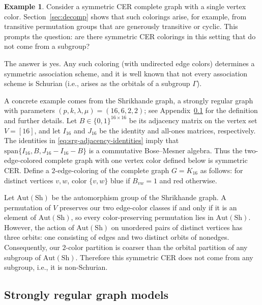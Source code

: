 \documentclass[12pt]{amsart}
\theoremstyle{plain}
\theoremstyle{definition}
\newtheorem{example}[theorem]{Example}
\theoremstyle{remark}
\newcommand{\1}{\mathbf{1}}
\begin{document}
\begin{example}\label{ex:shrikhande-non-schurian}
Consider a symmetric CER complete graph with a single vertex color.
Section~\ref{sec:decomp} shows that such colorings arise, for example, from
transitive permutation groups that are generously transitive or cyclic. This
prompts the question: are there symmetric CER colorings in this setting that
do not come from a subgroup?

The answer is yes. Any such coloring (with undirected edge colors) determines a symmetric association scheme, and it is well known that not every association scheme is Schurian (i.e., arises as the orbitals of a subgroup $\Gamma$). 

A concrete example comes from the Shrikhande graph,
a strongly regular graph with parameters
$(p,k,\lambda,\mu)=(16,6,2,2)$;
see Appendix~\ref{subsec:strongly-regular-graph-models}
for the definition and further details.
Let $B\in\{0,1\}^{16\times16}$ be its adjacency matrix
on the vertex set $V=[16]$, and let $I_{16}$ and $J_{16}$
be the identity and all-ones matrices, respectively.
The identities in \eqref{eq:srg-adjacency-identities}
imply that $\mathrm{span}\{I_{16},B,J_{16}-I_{16}-B\}$
is a commutative Bose--Mesner algebra.
Thus the two-edge-colored complete graph with one vertex color
defined below is symmetric CER.
Define a $2$-edge-coloring of the complete graph $G=K_{16}$ as follows: for distinct vertices $v,w$, color $\{v,w\}$ blue if $B_{vw}=1$ and red otherwise.

Let \(\mathrm{Aut}(\mathrm{Sh})\) be the automorphism group of the Shrikhande graph. A permutation of \(V\) preserves our two edge-color classes if and only if it is an element of \(\mathrm{Aut}(\mathrm{Sh})\), so every color-preserving permutation lies in \(\mathrm{Aut}(\mathrm{Sh})\). However, the action of \(\mathrm{Aut}(\mathrm{Sh})\) on unordered pairs of distinct vertices has three orbits: one consisting of edges and two distinct orbits of nonedges.  Consequently, our $2$-color partition is coarser than the orbital partition of any subgroup of \(\mathrm{Aut}(\mathrm{Sh})\). Therefore this symmetric CER does not come from any subgroup, i.e., it is non-Schurian.
\end{example}

\subsection{Strongly regular graph models}\label{subsec:strongly-regular-graph-models}
\end{document}
